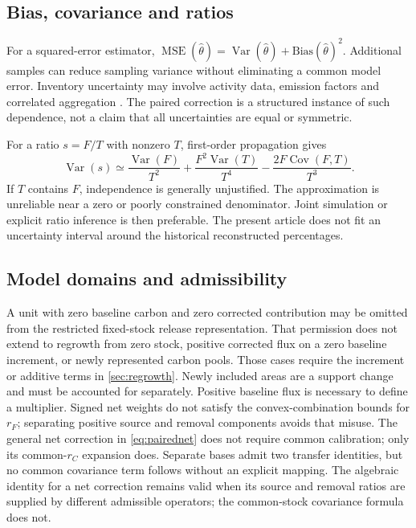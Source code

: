 \documentclass[11pt,a4paper]{article}
\DeclareMathOperator{\Cov}{Cov}
\DeclareMathOperator{\Var}{Var}
\DeclareMathOperator{\MSE}{MSE}
\theoremstyle{remark}
\begin{document}
\subsection{Bias, covariance and ratios}
For a squared-error estimator, $\MSE(\hat\theta)=\Var(\hat\theta)+\mathrm{Bias}(\hat\theta)^2$. Additional samples can reduce sampling variance without eliminating a common model error. Inventory uncertainty may involve activity data, emission factors and correlated aggregation \citep{Solazzo2021}. The paired correction is a structured instance of such dependence, not a claim that all uncertainties are equal or symmetric.

For a ratio $s=F/T$ with nonzero $T$, first-order propagation gives
\begin{equation}
\Var(s)\simeq \frac{\Var(F)}{T^2}+\frac{F^2\Var(T)}{T^4}
 -\frac{2F\Cov(F,T)}{T^3}.
\label{eq:delta}
\end{equation}
If $T$ contains $F$, independence is generally unjustified. The approximation is unreliable near a zero or poorly constrained denominator. Joint simulation or explicit ratio inference is then preferable. The present article does not fit an uncertainty interval around the historical reconstructed percentages.

\subsection{Model domains and admissibility}
A unit with zero baseline carbon and zero corrected contribution may be omitted from the restricted fixed-stock release representation. That permission does not extend to regrowth from zero stock, positive corrected flux on a zero baseline increment, or newly represented carbon pools. Those cases require the increment or additive terms in \cref{sec:regrowth}. Newly included areas are a support change and must be accounted for separately. Positive baseline flux is necessary to define a multiplier. Signed net weights do not satisfy the convex-combination bounds for $r_F$; separating positive source and removal components avoids that misuse. The general net correction in \eqref{eq:pairednet} does not require common calibration; only its common-$r_C$ expansion does. Separate bases admit two transfer identities, but no common covariance term follows without an explicit mapping. The algebraic identity for a net correction remains valid when its source and removal ratios are supplied by different admissible operators; the common-stock covariance formula does not.
\end{document}
